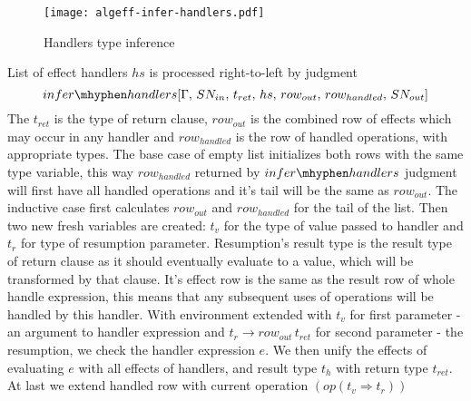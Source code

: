 \documentclass[inz, english, shortabstract]{iithesis}
\begin{document}
\begin{figure}
  \centering
  \texttt{[image: algeff-infer-handlers.pdf]}
  \caption{Handlers type inference} 
  \label{fig:algeff-infer-handlers} 
\end{figure} 

List of effect handlers $ hs $ is processed right-to-left by judgment 
$$ infer\mhyphen handlers [\Gamma , \, SN_{in} , \, t_{ret} , \, hs , \, row_{out} , \, row_{handled} , \, SN_{out}] $$
The $ t_{ret} $ is the type of return clause, $ row_{out} $ is the combined row of effects which may occur in any handler and $ row_{handled} $ is the row of handled operations, with appropriate types.
The base case of empty list initializes both rows with the same type variable, this way $ row_{handled} $ returned by $infer\mhyphen handlers$ judgment will first have all handled operations and it's tail will be the same as $ row_{out} $.
The inductive case first calculates $ row_{out} $ and $ row_{handled} $ for the tail of the list.
Then two new fresh variables are created: $ t_v $ for the type of value passed to handler and $ t_r $ for type of resumption parameter.
Resumption's result type is the result type of return clause as it should eventually evaluate to a value, which will be transformed by that clause.
It's effect row is the same as the result row of whole handle expression, this means that any subsequent uses of operations will be handled by this handler.
With environment extended with $ t_v $ for first parameter - an argument to handler expression and $ t_r \rightarrow row_{out} \, t_{ret} $ for second parameter - the resumption, we check the handler expression $ e $.
We then unify the effects of evaluating $ e $ with all effects of handlers, and result type $ t_{h} $ with return type $ t_{ret} $.
At last we extend handled row with current operation $ (op (t_v \Rightarrow t_r)) $
\end{document}
